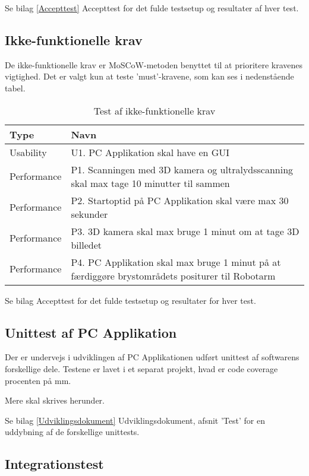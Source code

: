 Se bilag \ref{Accepttest} Accepttest for det fulde testsetup og resultater af hver test. 

\subsection{Ikke-funktionelle krav} 
De ikke-funktionelle krav er MoSCoW-metoden benyttet til at prioritere kravenes vigtighed. Det er valgt kun at teste ’must’-kravene, som kan ses i nedenstående tabel. 

\begin{table}[htb]
\centering
\begin{tabular}{ | l | p{} | }
\hline
\textbf{Type} & \textbf{Navn} \\\hline
Usability & U1. PC Applikation skal have en GUI \\\hline 
Performance & P1. Scanningen med 3D kamera og ultralydsscanning skal max tage 10
minutter til sammen \\\hline 
Performance & P2. Startoptid på PC Applikation skal være max 30 sekunder \\\hline
Performance & P3. 3D kamera skal max bruge 1 minut om at tage 3D billedet \\\hline 
Performance & P4. PC Applikation skal max bruge 1 minut på at færdiggøre brystområdets
positurer til Robotarm \\\hline 
\end{tabular}
\caption{Test af ikke-funktionelle krav}
\end{table}

Se bilag Accepttest for det fulde testsetup og resultater for hver test. 

\subsection{Unittest af PC Applikation}
Der er undervejs i udviklingen af PC Applikationen udført unittest af softwarens forskellige dele. 
Testene er lavet i et separat projekt, hvad er code coverage procenten på mm. 

Mere skal skrives herunder. 

Se bilag \ref{Udviklingsdokument} Udviklingsdokument, afsnit 'Test' for en uddybning af de forskellige unittests. 

\subsection{Integrationstest}